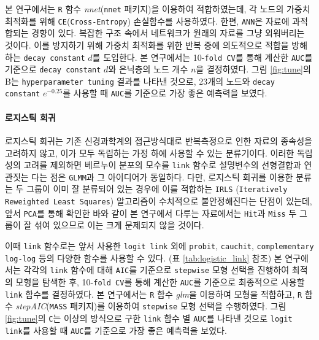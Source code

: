 \documentclass[10pt,onecolumn,twoside,a4size]{gsag3jnl}
\begin{document}
본 연구에서는 \texttt{R} 함수 \textit{nnet}(\texttt{nnet} 패키지)을 이용하여 적합하였는데, 각 노드의 가중치 최적화를 위해 \texttt{CE}(\texttt{Cross-Entropy}) 손실함수를 사용하였다. 한편, \texttt{ANN}은 자료에 과적합되는 경향이 있다. 복잡한 구조 속에서 네트워크가 원래의 자료를 그냥 외워버리는 것이다. 이를 방지하기 위해 가중치 최적화를 위한 반복 중에 의도적으로 적합을 방해하는 \texttt{decay constant} $d$를 도입한다. 본 연구에서는 10-\texttt{fold CV}를 통해 계산한 \texttt{AUC}를 기준으로 \texttt{decay constant} $d$와 은닉층의 노드 개수 $n$을 결정하였다. 그림 \ref{fig:tune}의 B는 \texttt{hyperparameter tuning} 결과를 나타낸 것으로, 23개의 노드와 \texttt{decay constant} $e^{-0.25}$를 사용할 때 \texttt{AUC}를 기준으로 가장 좋은 예측력을 보였다.

\paragraph{로지스틱 회귀}

로지스틱 회귀는 기존 신경과학계의 접근방식대로 반복측정으로 인한 자료의 종속성을 고려하지 않고, 이가 모두 독립하는 가정 하에 사용할 수 있는 분류기이다. 이러한 독립성의 고려를 제외하면 베르누이 분포의 모수를 \texttt{link} 함수로 설명변수의 선형결합과 연관짓는 다는 점은 \texttt{GLMM}과 그 아이디어가 동일하다. 다만, 로지스틱 회귀를 이용한 분류는 두 그룹이 이미 잘 분류되어 있는 경우에 이를 적합하는 \texttt{IRLS} (\texttt{Iteratively Reweighted Least Squares}) 알고리즘이 수치적으로 불안정해진다는 단점이 있는데, 앞서 \texttt{PCA}를 통해 확인한 바와 같이 본 연구에서 다루는 자료에서는 \texttt{Hit}과 \texttt{Miss} 두 그룹이 잘 섞여 있으므로 이는 크게 문제되지 않을 것이다.

이때 \texttt{link} 함수로는 앞서 사용한 \texttt{logit link} 외에 \texttt{probit}, \texttt{cauchit}, \texttt{complementary log-log} 등의 다양한 함수를 사용할 수 있다. (표 \ref{tab:logistic_link} 참조) 본 연구에서는 각각의 \texttt{link} 함수에 대해 \texttt{AIC}를 기준으로 \texttt{stepwise} 모형 선택을 진행하여 최적의 모형을 탐색한 후, 10-\texttt{fold CV}를 통해 계산한 \texttt{AUC}를 기준으로 최종적으로 사용할 \texttt{link} 함수를 결정하였다. 본 연구에서는 \texttt{R} 함수 \textit{glm}을 이용하여 모형을 적합하고, \texttt{R} 함수 \textit{stepAIC}(\texttt{MASS} 패키지)를 이용하여 \texttt{stepwise} 모형 선택을 수행하였다. 그림 \ref{fig:tune}의 \texttt{C}는 이상의 방식으로 구한 \texttt{link} 함수 별 \texttt{AUC}를 나타낸 것으로 \texttt{logit link}를 사용할 때 \texttt{AUC}를 기준으로 가장 좋은 예측력을 보였다.
\end{document}
